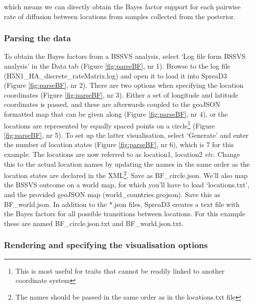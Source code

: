 \documentclass[english]{paper}
\begin{document}
\noindent
which means we can directly obtain the Bayes factor support for each pairwise rate of diffusion between locations from samples collected from the posterior. 

\subsubsection{Parsing the data}

To obtain the Bayes factors from a BSSVS analysis, select `Log file form BSSVS analysis' in the Data tab (Figure \ref{fig:parseBF}, nr 1).
Browse to the log file (H5N1\_HA\_discrete\_rateMatrix.log) and open it to load it into SpreaD3 (Figure \ref{fig:parseBF}, nr 2).
There are two options when specifying the location coordinates (Figure \ref{fig:parseBF}, nr 3).
Either a set of longitude and latitude coordinates is passed, and these are afterwards coupled to the geoJSON formatted map that can be given along (Figure \ref{fig:parseBF}, nr 4), or the locations are represented by equally spaced points on a circle\footnote{This is most useful for traits that cannot be readily linked to another coordinate system} (Figure \ref{fig:parseBF}, nr 5).
To set up the latter visualisation, select `Generate' and enter the number of location states (Figure \ref{fig:parseBF}, nr 6), which is 7 for this example.
The locations are now referred to as location1, location2 \textit{etc}. 
Change this to the actual location names by updating the names in the same order as the location states are declared in the XML\footnote{The names should be passed in the same order as in the locations.txt file}.
Save as BF\_circle.json.
We'll also map the BSSVS outcome on a world map, for which you'll have to load `locations.txt', and the provided geoJSON map (world\_countries.geojson).
Save this as BF\_world.json.
In addition to the *.json files, SpreaD3 creates a text file with the Bayes factors for all possible transitions between locations. 
For this example these are named BF\_circle.json.txt and BF\_world.json.txt.

\subsubsection{Rendering and specifying the visualisation options}
\end{document}
